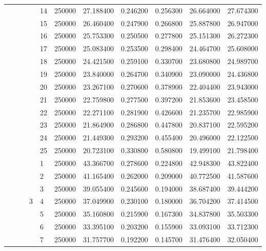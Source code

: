 \begin{tabular}{llllllrrrrr}
\cline{5-11}
 &  &  &  & 14 & 250000 & 27.188400 & 0.246200 & 0.256300 & 26.664000 & 27.674300 \\
\cline{5-11}
 &  &  &  & 15 & 250000 & 26.460400 & 0.247900 & 0.266800 & 25.887800 & 26.947000 \\
\cline{5-11}
 &  &  &  & 16 & 250000 & 25.753300 & 0.250500 & 0.277800 & 25.151300 & 26.272300 \\
\cline{5-11}
 &  &  &  & 17 & 250000 & 25.083400 & 0.253500 & 0.298400 & 24.464700 & 25.608000 \\
\cline{5-11}
 &  &  &  & 18 & 250000 & 24.421500 & 0.259100 & 0.330700 & 23.680800 & 24.989700 \\
\cline{5-11}
 &  &  &  & 19 & 250000 & 23.840000 & 0.264700 & 0.340900 & 23.090000 & 24.436800 \\
\cline{5-11}
 &  &  &  & 20 & 250000 & 23.267100 & 0.270600 & 0.378900 & 22.404400 & 23.943000 \\
\cline{5-11}
 &  &  &  & 21 & 250000 & 22.759800 & 0.277500 & 0.397200 & 21.853600 & 23.458500 \\
\cline{5-11}
 &  &  &  & 22 & 250000 & 22.271100 & 0.281900 & 0.426600 & 21.235700 & 22.985900 \\
\cline{5-11}
 &  &  &  & 23 & 250000 & 21.864900 & 0.286800 & 0.447800 & 20.837100 & 22.595200 \\
\cline{5-11}
 &  &  &  & 24 & 250000 & 21.449300 & 0.293200 & 0.455400 & 20.496000 & 22.122500 \\
\cline{5-11}
 &  &  &  & 25 & 250000 & 20.723100 & 0.330800 & 0.580800 & 19.499100 & 21.798400 \\
\cline{4-11} \cline{5-11}
 &  &  & \multirow[t]{25}{*}{3} & 1 & 250000 & 43.366700 & 0.278600 & 0.224800 & 42.948300 & 43.822400 \\
\cline{5-11}
 &  &  &  & 2 & 250000 & 41.165400 & 0.262000 & 0.209000 & 40.772500 & 41.587600 \\
\cline{5-11}
 &  &  &  & 3 & 250000 & 39.055400 & 0.245600 & 0.194000 & 38.687400 & 39.444200 \\
\cline{5-11}
 &  &  &  & 4 & 250000 & 37.049900 & 0.230100 & 0.180000 & 36.704200 & 37.414500 \\
\cline{5-11}
 &  &  &  & 5 & 250000 & 35.160800 & 0.215900 & 0.167300 & 34.837800 & 35.503300 \\
\cline{5-11}
 &  &  &  & 6 & 250000 & 33.395100 & 0.203200 & 0.155900 & 33.093100 & 33.712300 \\
\cline{5-11}
 &  &  &  & 7 & 250000 & 31.757700 & 0.192200 & 0.145700 & 31.476400 & 32.050400 \\

\end{tabular}
